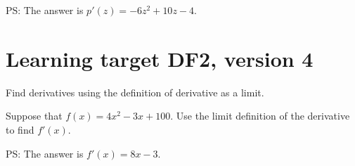 \vfill

PS: The answer is $p'(z) = -6z^2 + 10z - 4.$

\pagebreak

\section{Learning target DF2, version 4}

Find derivatives using the definition of derivative as a limit.

\hrulefill

Suppose that  \(f(x)=4x^2-3x+100\). Use the limit definition of the derivative to find $f'(x)$.

\vfill

PS: The answer is $f'(x) = 8x - 3.$


